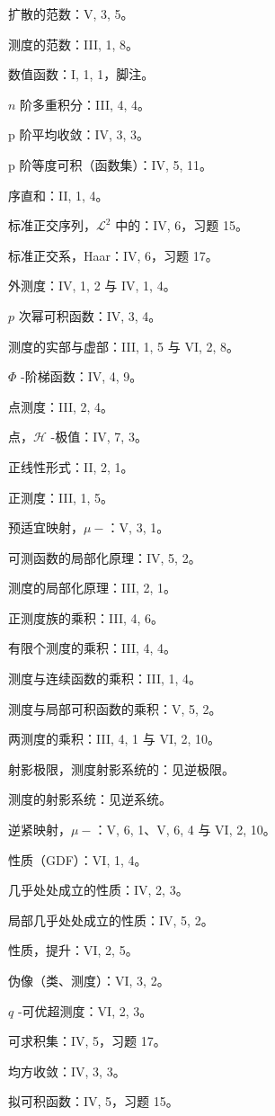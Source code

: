 扩散的范数：V, 3, 5。

测度的范数：III, 1, 8。

数值函数：I, 1, 1，脚注。

\(n\) 阶多重积分：III, 4, 4。

p 阶平均收敛：IV, 3, 3。

p 阶等度可积（函数集）：IV, 5, 11。

序直和：II, 1, 4。

标准正交序列，\(\mathcal{L}^2\) 中的：IV, 6，习题 15。

标准正交系，Haar：IV, 6，习题 17。

外测度：IV, 1, 2 与 IV, 1, 4。

\(p\) 次幂可积函数：IV, 3, 4。

测度的实部与虚部：III, 1, 5 与 VI, 2, 8。

\(\Phi\) -阶梯函数：IV, 4, 9。

点测度：III, 2, 4。

点，\(\mathcal{H}\) -极值：IV, 7, 3。

正线性形式：II, 2, 1。

正测度：III, 1, 5。

预适宜映射，\(\mu-\)：V, 3, 1。

可测函数的局部化原理：IV, 5, 2。

测度的局部化原理：III, 2, 1。

正测度族的乘积：III, 4, 6。

有限个测度的乘积：III, 4, 4。

测度与连续函数的乘积：III, 1, 4。

测度与局部可积函数的乘积：V, 5, 2。

两测度的乘积：III, 4, 1 与 VI, 2, 10。

射影极限，测度射影系统的：见逆极限。

测度的射影系统：见逆系统。

逆紧映射，\(\mu-\)：V, 6, 1、V, 6, 4 与 VI, 2, 10。

性质（GDF）：VI, 1, 4。

几乎处处成立的性质：IV, 2, 3。

局部几乎处处成立的性质：IV, 5, 2。

性质，提升：VI, 2, 5。

伪像（类、测度）：VI, 3, 2。

\(q\) -可优超测度：VI, 2, 3。

可求积集：IV, 5，习题 17。

均方收敛：IV, 3, 3。

拟可积函数：IV, 5，习题 15。

